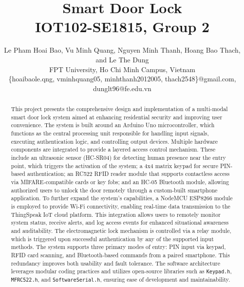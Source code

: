 \documentclass[conference, onecolumn]{IEEEtran}
\begin{document}
\title{Smart Door Lock\\
{\large IOT102-SE1815, Group 2}}
\pagestyle{fancy}
\fancyhf{} 
\renewcommand{\headrulewidth}{0pt}
\fancyfoot[C]{\thepage}  %
\author{
Le Pham Hoai Bao, Vu Minh Quang, Nguyen Minh Thanh, Hoang Bao Thach, and Le The Dung\\
FPT University, Ho Chi Minh Campus, Vietnam\\
\{hoaibaole.qng, vminhquang05, minhthanh2012005, thach2548\}@gmail.com, dunglt96@fe.edu.vn}
\maketitle

\begin{abstract}
This project presents the comprehensive design and implementation of a multi-modal smart door lock system aimed at enhancing residential security and improving user convenience. The system is built around an Arduino Uno microcontroller, which functions as the central processing unit responsible for handling input signals, executing authentication logic, and controlling output devices. Multiple hardware components are integrated to provide a layered access control mechanism. These include an ultrasonic sensor (HC-SR04) for detecting human presence near the entry point, which triggers the activation of the system; a 4x4 matrix keypad for secure PIN-based authentication; an RC522 RFID reader module that supports contactless access via MIFARE-compatible cards or key fobs; and an HC-05 Bluetooth module, allowing authorized users to unlock the door remotely through a custom-built smartphone application.
To further expand the system’s capabilities, a NodeMCU ESP8266 module is employed to provide Wi-Fi connectivity, enabling real-time data transmission to the ThingSpeak IoT cloud platform. This integration allows users to remotely monitor system status, receive alerts, and log access events for enhanced situational awareness and auditability. The electromagnetic lock mechanism is controlled via a relay module, which is triggered upon successful authentication by any of the supported input methods.
The system supports three primary modes of entry: PIN input via keypad, RFID card scanning, and Bluetooth-based commands from a paired smartphone. This redundancy improves both usability and fault tolerance. The software architecture leverages modular coding practices and utilizes open-source libraries such as \texttt{Keypad.h}, \texttt{MFRC522.h}, and \texttt{SoftwareSerial.h}, ensuring ease of development and maintainability.

\end{abstract}
\end{document}
